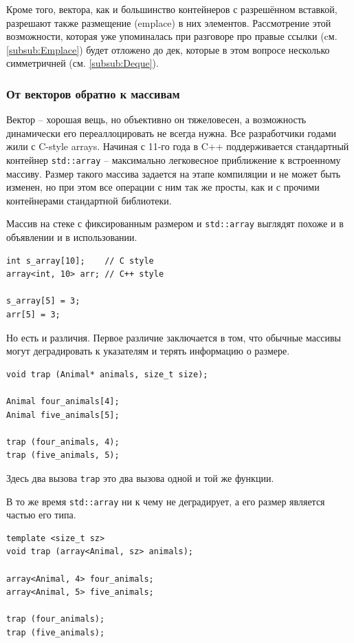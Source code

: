 \documentclass[a4paper,12pt,oneside]{article}
\begin{document}
Кроме того, вектора, как и большинство контейнеров с разрешённом вставкой, разрешают также размещение (emplace) в них элементов. Рассмотрение этой возможности, которая уже упоминалась при разговоре про правые ссылки (cм. \ref{subsub:Emplace}) будет отложено до дек, которые в этом вопросе несколько симметричней (см. \ref{subsub:Deque}).

\subsubsection{От векторов обратно к массивам}\label{InvArrays}

Вектор -- хорошая вещь, но объективно он тяжеловесен, а возможность динамически его переаллоцировать не всегда нужна. Все разработчики годами жили с C-style arrays. Начиная с 11-го года в C++ поддерживается стандартный контейнер \lstinline!std::array! -- максимально легковесное приближение к встроенному массиву. Размер такого массива задается на этапе компиляции и не может быть изменен, но при этом все операции с ним так же просты, как и с прочими контейнерами стандартной библиотеки.

Массив на стеке с фиксированным размером и \lstinline!std::array! выглядят похоже и в объявлении и в использовании.

\begin{lstlisting}
int s_array[10];    // C style
array<int, 10> arr; // C++ style

s_array[5] = 3;
arr[5] = 3;
\end{lstlisting}

Но есть и различия. Первое различие заключается в том, что обычные массивы могут деградировать к указателям и терять информацию о размере.

\begin{lstlisting}
void trap (Animal* animals, size_t size);

Animal four_animals[4];
Animal five_animals[5];

trap (four_animals, 4);
trap (five_animals, 5);
\end{lstlisting}

Здесь два вызова \lstinline!trap! это два вызова одной и той же функции.

В то же время \lstinline!std::array! ни к чему не деградирует, а его размер является частью его типа.

\begin{lstlisting}
template <size_t sz> 
void trap (array<Animal, sz> animals);

array<Animal, 4> four_animals;
array<Animal, 5> five_animals;

trap (four_animals);
trap (five_animals);
\end{lstlisting}
\end{document}
